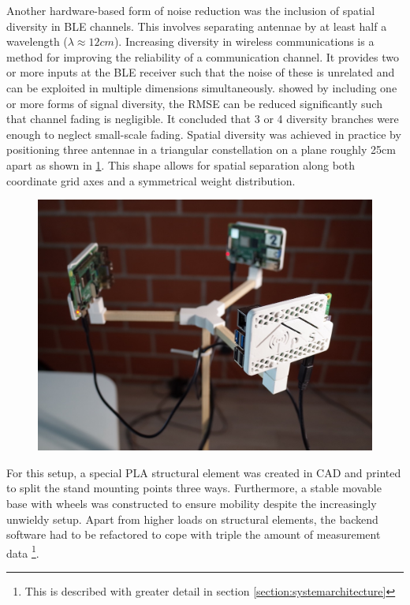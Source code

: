 \documentclass[a4paper, oneside]{ipsreport}
\begin{document}
Another hardware-based form of noise reduction was the inclusion of spatial diversity in BLE channels. This involves separating antennae by at least half a wavelength ($\lambda \approx 12cm$). Increasing diversity in wireless communications is a method for improving the reliability of a communication channel. It provides two or more inputs at the BLE receiver such that the noise of these is unrelated and can be exploited in multiple dimensions simultaneously. \cite{AntennaDiversity} showed by including one or more forms of signal diversity, the RMSE can be reduced significantly such that channel fading is negligible. It concluded that 3 or 4 diversity branches were enough to neglect small-scale fading. Spatial diversity was achieved in practice by positioning three antennae in a triangular constellation on a plane roughly 25cm apart as shown in \ref{fig:multiclient}. This shape allows for spatial separation along both coordinate grid axes and a symmetrical weight distribution.

\begin{figure}[h]
	\centering
	\begin{minipage}{.75\textwidth}
		\centering
		\includegraphics[width=\linewidth]{./figures/multiclient.jpg}
		\label{fig:multiclient}
	\end{minipage}%
\end{figure}

For this setup, a special PLA structural element was created in CAD and printed to split the stand mounting points three ways. Furthermore, a stable movable base with wheels was constructed to ensure mobility despite the increasingly unwieldy setup. Apart from higher loads on structural elements, the backend software had to be refactored to cope with triple the amount of measurement data \footnote{This is described with greater detail in section \ref{section:systemarchitecture}}.
\end{document}
